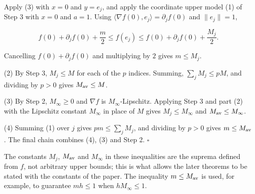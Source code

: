 \documentclass[11pt,a4paper]{article}
\begin{document}
Apply (3) with \(x=0\) and \(y=e_j\), and apply the coordinate upper model (1) of Step 3 with \(x=0\) and \(a=1\). Using \(\langle\nabla f(0),e_j\rangle=\partial_jf(0)\) and \(\|e_j\|=1\),


\[f(0)+\partial_jf(0)+\frac m2\le f(e_j)\le f(0)+\partial_jf(0)+\frac{M_j}2.\]


Cancelling \(f(0)+\partial_jf(0)\) and multiplying by \(2\) gives \(m\le M_j\).




(2) By Step 3, \(M_j\le M\) for each of the \(p\) indices. Summing, \(\sum_jM_j\le pM\), and dividing by \(p>0\) gives \(M_{\rm av}\le M\).




(3) By Step 2, \(M_\infty\ge0\) and \(\nabla f\) is \(M_\infty\)-Lipschitz. Applying Step 3 and part (2) with the Lipschitz constant \(M_\infty\) in place of \(M\) gives \(M_j\le M_\infty\) and \(M_{\rm av}\le M_\infty\).




(4) Summing (1) over \(j\) gives \(pm\le\sum_jM_j\), and dividing by \(p>0\) gives \(m\le M_{\rm av}\). The final chain combines (4), (3) and Step 2. \(\square\)




The constants \(M_j\), \(M_{\rm av}\) and \(M_\infty\) in these inequalities are the suprema defined from \(f\), not arbitrary upper bounds; this is what allows the later theorems to be stated with the constants of the paper. The inequality \(m\le M_{\rm av}\) is used, for example, to guarantee \(mh\le1\) when \(hM_\infty\le1\).
\end{document}
